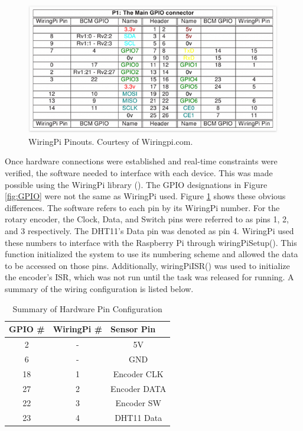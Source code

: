 \documentclass[letterpaper, 12pt]{article}
\begin{document}
\begin{figure}[H]
	\centering
	\includegraphics[width=15cm,keepaspectratio]{pi_pins.png}
	\caption[Pinouts]{WiringPi Pinouts. Courtesy of Wiringpi.com.}
	\label{fig:pinouts}
\end{figure}

\indent Once hardware connections were established and real-time constraints were verified, the software needed to interface with each device.  This was made possible using the WiringPi library (\cite{gordonhenderson2018}).  The GPIO designations in Figure \ref{fig:GPIO} were not the same as WiringPi used.  Figure \ref{fig:pinouts} shows these obvious differences. The software refers to each pin by its WiringPi number.  For the rotary encoder, the Clock, Data, and Switch pins were referred to as pins 1, 2, and 3 respectively.  The DHT11's Data pin was denoted as pin 4.  WiringPi used these numbers to interface with the Raspberry Pi through wiringPiSetup().  This function initialized the system to use its numbering scheme and allowed the data to be accessed on those pins.  Additionally, wiringPiISR() was used to initialize the encoder's ISR, which was not run until the task was released for running. A summary of the wiring configuration is listed below.

\begin{table}[hbt]
	\centering
	\caption{Summary of Hardware Pin Configuration}
	\label{my-label}
	\begin{tabular}{|c|c|c|}
		\hline
		\multicolumn{1}{|l|}{GPIO \#} & \multicolumn{1}{l|}{WiringPi \#} & \multicolumn{1}{l|}{Sensor Pin} \\ \hline
		2                             & -                                & 5V                              \\ \hline
		6                             & -                                & GND                             \\ \hline
		18                            & 1                                & Encoder CLK                     \\ \hline
		27                            & 2                                & Encoder DATA                    \\ \hline
		22                            & 3                                & Encoder SW                      \\ \hline
		23                            & 4                                & DHT11 Data                      \\ \hline
	\end{tabular}
\end{table}
\end{document}
